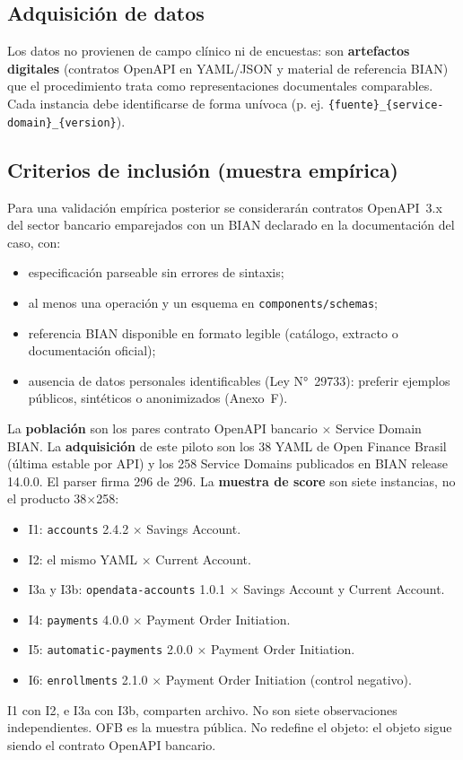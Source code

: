 \subsection{Adquisición de datos}

Los datos no provienen de campo clínico ni de encuestas: son \textbf{artefactos digitales}
(contratos OpenAPI en YAML/JSON y material de referencia BIAN) que el procedimiento trata como
representaciones documentales comparables. Cada instancia debe identificarse de forma unívoca (p. ej.
\texttt{\{fuente\}\_\{service-domain\}\_\{version\}}).



\subsection{Criterios de inclusión (muestra empírica)}

Para una validación empírica posterior se considerarán contratos OpenAPI~3.x del sector bancario
emparejados con un \ServiceDomain{} BIAN declarado en la documentación del caso, con:

\begin{itemize}
  \item especificación parseable sin errores de sintaxis;
  \item al menos una operación y un esquema en \texttt{components/schemas};
  \item referencia BIAN disponible en formato legible (catálogo, extracto o documentación oficial);
  \item ausencia de datos personales identificables (Ley N°~29733): preferir ejemplos públicos,
        sintéticos o anonimizados (Anexo~F).
\end{itemize}

La \textbf{población} son los pares contrato OpenAPI bancario $\times$ Service Domain BIAN. La
\textbf{adquisición} de este piloto son los 38 YAML de Open Finance Brasil (última estable por
API) y los 258 Service Domains publicados en BIAN release 14.0.0. El parser firma 296 de 296.
La \textbf{muestra de score} son siete instancias, no el producto 38$\times$258:

\begin{itemize}
  \item I1: \texttt{accounts} 2.4.2 $\times$ Savings Account.
  \item I2: el mismo YAML $\times$ Current Account.
  \item I3a y I3b: \texttt{opendata-accounts} 1.0.1 $\times$ Savings Account y Current Account.
  \item I4: \texttt{payments} 4.0.0 $\times$ Payment Order Initiation.
  \item I5: \texttt{automatic-payments} 2.0.0 $\times$ Payment Order Initiation.
  \item I6: \texttt{enrollments} 2.1.0 $\times$ Payment Order Initiation (control negativo).
\end{itemize}

I1 con I2, e I3a con I3b, comparten archivo. No son siete observaciones independientes. OFB es
la muestra pública. No redefine el objeto: el objeto sigue siendo el contrato OpenAPI bancario.
